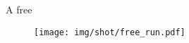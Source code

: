 A free
\begin{figure}[H]
	\centering
	\texttt{[image: img/shot/free\_run.pdf]}
	\caption[]{}
	\label{fig:free_run}
\end{figure}
